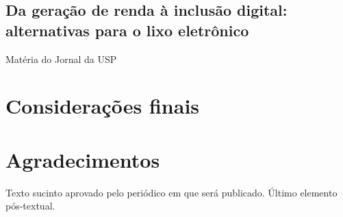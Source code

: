 \documentclass[
	article,			%
	11pt,				%
	oneside,			%
	a4paper,			%
	english,			%
	brazil,				%
	sumario=tradicional
	]{abntex2}
\begin{document}
\subsection{Da geração de renda à inclusão digital: alternativas para o lixo eletrônico}
Matéria do Jornal da USP
\cite{alternativas-lixo-eletronico}

% 

\section{Considerações finais}


\postextual



%
%


\begin{apendicesenv}
\end{apendicesenv}

\begin{anexosenv}
\end{anexosenv}


\section*{Agradecimentos}
Texto sucinto aprovado pelo periódico em que será publicado. Último elemento pós-textual.
\end{document}
